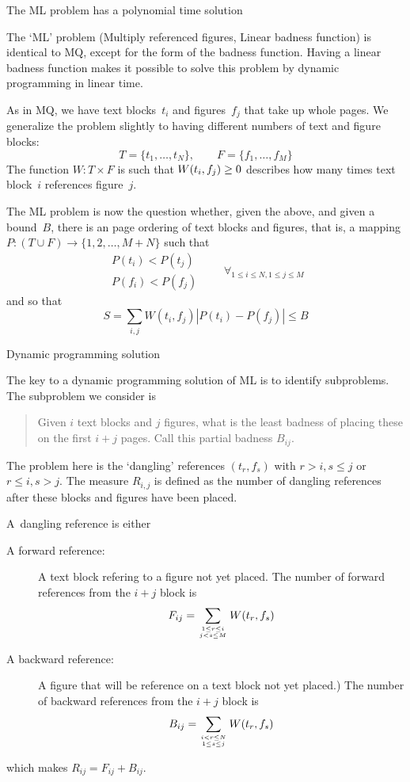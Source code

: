  {The ML problem has a polynomial time solution}

The `ML' problem (Multiply referenced figures, Linear badness
function) is identical to MQ, except for the form of the badness function.
Having a linear badness function makes it
possible to solve this problem by dynamic programming in linear time.

As in MQ, we have text blocks~$t_i$ and figures~$f_j$ that take up
whole pages.
We generalize the problem slightly to having different numbers of text
and figure blocks:
\[ T=\{t_1,\ldots,t_N\},\qquad F=\{f_1,\ldots,f_M\} \]
The function $W:T\times F$ is such that $W(t_i,f_j)\geq\nobreak 0$
describes how many times text block~$i$ references figure~$j$.

The ML problem is now the question whether, given the above, and given
a bound~$B$, there is an page ordering of
text blocks and figures, that is, a mapping $P:(T\cup F)\rightarrow
\{1,2,\ldots,M+N\}$ such that
\[ \begin{array}{cc}P(t_i)<P(t_j)\\ P(f_i)<P(f_j)
    \end{array}\qquad\forall_{1\leq i\leq N,1\leq j\leq M}
\]
and so that
\newcommand\WPP[2]{\WPPf{#1}{#2}{#1}{#2}}
\newcommand\WPPf[4]{W(t_#1,f_#2)\left|P(t_#3)-P(f_#4)\right|}
\[ S=\sum_{i,j}\WPP ij \leq B \]

 {Dynamic programming solution}

The key to a dynamic programming solution of ML is to identify
subproblems. The subproblem we consider is
\begin{quote}
Given $i$ text blocks and $j$ figures, what is the least badness of
placing these on the first $i+j$ pages. Call this partial badness $B_{ij}$. 
\end{quote}
The problem
here is the `dangling' references $(t_r,f_s)$ with $r>i,s\leq j$ or
$r\leq i,s>j$. The measure $R_{i,j}$ is defined as the
number of dangling references after these blocks and figures
have been placed.

A~dangling reference is either
\begin{description}
\item[A forward reference:] A text block refering to a figure not yet
  placed. The number of forward references from the $i+j$ block is
\[ F_{ij}=\sum_{{1\leq r\leq i\atop j<s\leq M}} W(t_r,f_s) \]
\item[A backward reference:] A figure that will be reference on a text
  block not yet placed.) The number of backward references from
  the $i+j$ block is
\[ B_{ij} = \sum_{{i< r\leq N\atop 1\leq s\leq j}} W(t_r,f_s) \]
\end{description}
which makes $R_{ij}=F_{ij}+B_{ij}$.


